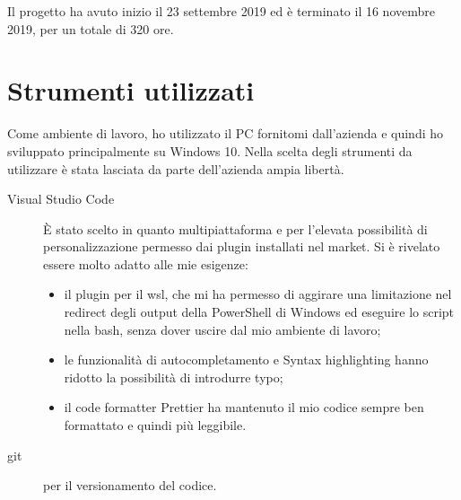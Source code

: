 Il progetto ha avuto inizio il 23 settembre 2019 ed è terminato il 16 novembre 2019, per
un totale di 320 ore.


%
%
%

\section{Strumenti utilizzati}
Come ambiente di lavoro, ho utilizzato il PC fornitomi dall'azienda e
quindi ho sviluppato principalmente su Windows 10.
Nella scelta degli strumenti da utilizzare è stata lasciata da parte dell'azienda
ampia libertà.

\begin{description}
    \item[Visual Studio Code] È stato scelto in quanto multipiattaforma e per 
    l'elevata possibilità di personalizzazione permesso dai plugin installati 
    nel market. Si è rivelato essere molto adatto alle mie esigenze:
    \begin{itemize}
        \item il plugin per il \gls{wsl}, che mi ha permesso di aggirare una limitazione nel redirect degli output della PowerShell di Windows ed eseguire lo script nella bash, senza dover uscire dal mio ambiente di lavoro; 
        \item le funzionalità di autocompletamento e Syntax highlighting hanno ridotto la possibilità di introdurre typo;
        \item il code formatter Prettier ha mantenuto il mio codice sempre ben formattato e quindi più leggibile.
    \end{itemize}
    
    \item[\gls{git}] per il versionamento del codice.
\end{description}

